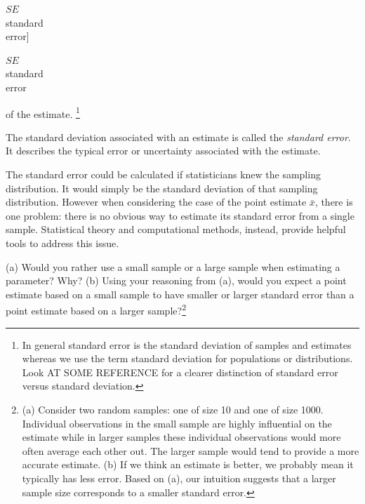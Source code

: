 $SE$\\\footnotesize standard\\error]{\raggedright\vspace{-4mm}

$SE$\\\footnotesize standard\\error} of the estimate. \footnote{In general standard error is the standard deviation of samples and estimates whereas we use the term standard deviation for populations or distributions. Look AT SOME REFERENCE for a clearer distinction of standard error versus standard deviation.} 

\begin{termBox}{
The standard deviation associated with an estimate is called the \emph{standard error}. It describes the typical error or uncertainty associated with the estimate.}
\end{termBox}

The standard error could be calculated if statisticians knew the sampling distribution. It would simply be the standard deviation of that sampling distribution. However when considering the case of the point estimate $\bar{x}$, there is one problem: there is no obvious way to estimate its standard error from a single sample. Statistical theory and computational methods, instead, provide helpful tools to address this issue. 

\begin{exercise}
(a) Would you rather use a small sample or a large sample when estimating a parameter? Why? (b) Using your reasoning from (a), would you expect a point estimate based on a small sample to have smaller or larger standard error than a point estimate based on a larger sample?\footnote{(a) Consider two random samples: one of size 10 and one of size 1000. Individual observations in the small sample are highly influential on the estimate while in larger samples these individual observations would more often average each other out. The larger sample would tend to provide a more accurate estimate. (b) If we think an estimate is better, we probably mean it typically has less error. Based on (a), our intuition suggests that a larger sample size corresponds to a smaller standard error.}
\end{exercise}


